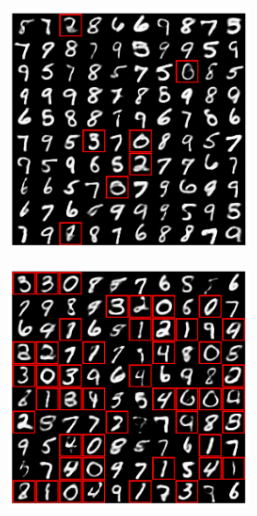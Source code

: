 \begin{figure}[H]
    \centering
    \begin{subfigure}{0.45\textwidth}
        \centering
        \includegraphics[width=0.7\textwidth]{Figures/Methods/ub09_random_generation.png}
    \end{subfigure}
    \hfill
    \begin{subfigure}{0.45\textwidth}
        \centering
        \includegraphics[width=0.7\textwidth]{Figures/Methods/invw_ub09_random_generation.png}
    \end{subfigure}
    \hfill
    \begin{subfigure}{0.45\textwidth}
        \centering

\end{subfigure}
\end{figure}
